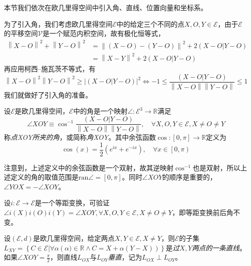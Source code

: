\documentclass[main.tex]{subfiles}
\begin{document}
本节我们依次在欧几里得空间中引入角、直线、位置向量和坐标系。

为了引入角，我们考虑欧几里得空间$\mathcal{E}$中的给定三个不同的点$X,O,Y\in\mathcal{E}$，由于$\mathcal{E}$的平移空间$\mathcal{V}$是一个赋范内积空间，故有极化恒等式，
\begin{align*}
    \left\|X-O\right\|^2+\left\|Y-O\right\|^2 & =\left\|\left(X-O\right)-\left(Y-O\right)\right\|^2+2\left(X-O|Y-O\right) \\
                                              & =\left\|X-Y\right\|^2+2\left(X-O|Y-O\right)
\end{align*}
再应用柯西--施瓦茨不等式，有
\[\left\|X-O\right\|^2\left\|Y-O\right\|^2\geq\left|\left(X-O|Y-O\right)\right|^2\Leftrightarrow-1\leq\frac{\left(X-O|Y-O\right)}{\left\|X-O\right\|\left\|Y-O\right\|}\leq1\]
我们就做好了引入角的准备。

\begin{definition}[角]\label{def:II.3.6}
    设$\mathcal{E}$是欧几里得空间，$\mathcal{E}$中的角是一个映射$\angle:\mathcal{E}^3\rightarrow\mathbb{R}$满足
    \[\angle XOY\equiv\cos^{-1}\frac{\left(X-O|Y-O\right)}{\left\|X-O\right\|\left\|Y-O\right\|},\quad\forall X,O,Y\in\mathcal{E},X\neq O\neq Y\]
    称\emph{点XOY所夹的角}，或简称\emph{角XOY}。其中余弦函数$\cos:\left[0,\pi\right]\rightarrow\mathbb{R}$定义为
    \[\cos\left(x\right)=\frac{1}{2}\left(e^{ix}+e^{-ix}\right),\quad\forall x\in\left[0,\pi\right)\]
\end{definition}

注意到，上述定义中的余弦函数是一个双射，故其逆映射$\cos^{-1}$也是双射，所以上述定义的角的取值范围是$\mathrm{ran}\angle=\left[0,\pi\right]$。同时$\angle XOY$的顺序是重要的，$\angle YOX=-\angle XOY$。


设$i:\mathcal{E}\rightarrow\mathcal{E}$是一个等距变换，可验证$\angle i\left(X\right)i\left(O\right)i\left(Y\right)=\angle XOY,\forall X,O,Y\in\mathcal{E},X\neq O\neq Y$，即等距变换前后角不变。

\begin{definition}[过两点的直线]\label{def:II.3.7}
    设$\left(\mathcal{E},d\right)$是欧几里得空间，给定两点$X,Y\in\mathcal{E},X\neq Y$，则$\mathcal{E}$的子集$L_{XY}=\left\{C\in\mathcal{E}|\forall \alpha\left(\alpha)\in\mathbb{R}\wedge C=X+\alpha\left(Y-X\right)\right)\right\}$是\emph{过}$X,Y$\emph{两点的一条直线}。如果$\angle XOY=\frac{\pi}{2}$，则直线$L_{OX}$与$L_{OY}$\emph{垂直}，记为$L_{OX}\perp L_{OY}$。
\end{definition}
\end{document}

